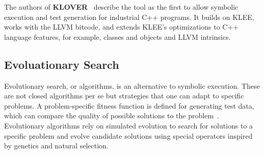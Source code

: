 \documentclass{article}
\begin{document}
The authors of \textbf{KLOVER}~\cite{Li2011} describe the tool as the first to allow symbolic execution and test generation for industrial C++ programs. It builds on KLEE, works with the LLVM bitcode, and extends KLEE's optimizations to C++ language features, for example, classes and objects and LLVM intrinsics.

\subsection{Evoluationary Search}

Evolutionary search, or algorithms, is an alternative to symbolic execution. These are not closed algorithms per se but strategies that one can adapt to specific problems. A problem-specific fitness function is defined for generating test data, which can compare the quality of possible solutions to the problem~\cite{McMinn_2004}. Evolutionary algorithms rely on simulated evolution to search for solutions to a specific problem and evolve candidate solutions using special operators inspired by genetics and natural selection.

\end{document}
